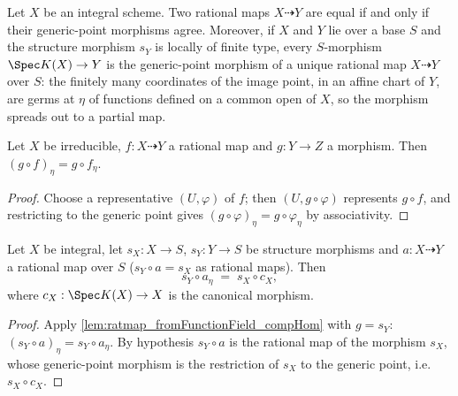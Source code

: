 \begin{theorem}
  \label{thm:ratmap_functionField_correspondence}
  \mathlibok
  \leanok
  Let \(X\) be an integral scheme. Two rational maps \(X \dashrightarrow Y\) are
  equal if and only if their generic-point morphisms agree. Moreover, if \(X\)
  and \(Y\) lie over a base \(S\) and the structure morphism \(s_Y\) is locally
  of finite type, every \(S\)-morphism \(\Spec K(X) \to Y\) is the generic-point
  morphism of a unique rational map \(X \dashrightarrow Y\) over \(S\): the
  finitely many coordinates of the image point, in an affine chart of \(Y\), are
  germs at \(\eta\) of functions defined on a common open of \(X\), so the
  morphism spreads out to a partial map.
\end{theorem}

\begin{lemma}
  \label{lem:ratmap_fromFunctionField_compHom}
  \leanok
  Let \(X\) be irreducible, \(f : X \dashrightarrow Y\) a rational map and
  \(g : Y \to Z\) a morphism. Then \((g \circ f)_\eta = g \circ f_\eta\).
\end{lemma}
\begin{proof}
  \leanok
  Choose a representative \((U, \varphi)\) of \(f\); then \((U, g \circ \varphi)\)
  represents \(g \circ f\), and restricting to the generic point gives
  \((g \circ \varphi)_\eta = g \circ \varphi_\eta\) by associativity.
\end{proof}

\begin{lemma}
  \label{lem:ratmap_fromFunctionField_over}
  \leanok
  Let \(X\) be integral, let \(s_X : X \to S\), \(s_Y : Y \to S\) be structure
  morphisms and \(a : X \dashrightarrow Y\) a rational map over \(S\)
  (\(s_Y \circ a = s_X\) as rational maps). Then
  \[
    s_Y \circ a_\eta \;=\; s_X \circ c_X,
  \]
  where \(c_X : \Spec K(X) \to X\) is the canonical morphism.
\end{lemma}
\begin{proof}
  \leanok
  Apply \ref{lem:ratmap_fromFunctionField_compHom} with \(g = s_Y\):
  \((s_Y \circ a)_\eta = s_Y \circ a_\eta\). By hypothesis \(s_Y \circ a\) is the
  rational map of the morphism \(s_X\), whose generic-point morphism is the
  restriction of \(s_X\) to the generic point, i.e.\ \(s_X \circ c_X\).
\end{proof}

